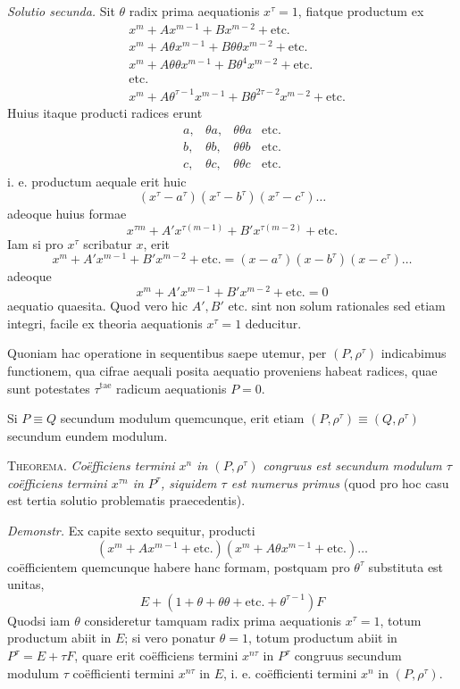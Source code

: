 \emph{Solutio secunda.} Sit $\theta$ radix prima aequationis $x^\tau=1$, fiatque productum ex
\[
\begin{aligned}
&x^m+Ax^{m-1}+Bx^{m-2}+\text{etc.}\\
&x^m+A\theta x^{m-1}+B\theta\theta x^{m-2}+\text{etc.}\\
&x^m+A\theta\theta x^{m-1}+B\theta^4x^{m-2}+\text{etc.}\\
&\text{etc.}\\
&x^m+A\theta^{\tau-1}x^{m-1}+B\theta^{2\tau-2}x^{m-2}+\text{etc.}
\end{aligned}
\]
Huius itaque producti radices erunt
\[
\begin{array}{llll}
a,&\theta a,&\theta\theta a&\text{etc.}\\
b,&\theta b,&\theta\theta b&\text{etc.}\\
c,&\theta c,&\theta\theta c&\text{etc.}
\end{array}
\]
i. e. productum aequale erit huic
\[
(x^\tau-a^\tau)(x^\tau-b^\tau)(x^\tau-c^\tau)\ldots
\]
adeoque huius formae
\[
x^{\tau m}+A'x^{\tau(m-1)}+B'x^{\tau(m-2)}+\text{etc.}
\]
Iam si pro $x^\tau$ scribatur $x$, erit
\[
x^m+A'x^{m-1}+B'x^{m-2}+\text{etc.}=(x-a^\tau)(x-b^\tau)(x-c^\tau)\ldots
\]
adeoque
\[
x^m+A'x^{m-1}+B'x^{m-2}+\text{etc.}=0
\]
aequatio quaesita. Quod vero hic $A',B'$ etc. sint non solum rationales sed etiam integri, facile ex theoria aequationis $x^\tau=1$ deducitur.

Quoniam hac operatione in sequentibus saepe utemur, per $(P,\rho^\tau)$ 
%
indicabimus functionem, qua cifrae aequali posita aequatio proveniens habeat radices, quae sunt potestates $\tau^{\mathrm{tae}}$ radicum aequationis $P=0$.

Si $P\equiv Q$ secundum modulum quemcunque, erit etiam $(P,\rho^\tau)\equiv(Q,\rho^\tau)$ secundum eundem modulum.

\textsc{Theorema.} \emph{Coëfficiens termini $x^n$ in $(P,\rho^\tau)$ congruus est secundum modulum $\tau$ coëfficiens termini $x^{\tau n}$ in $P^\tau$, siquidem $\tau$ est numerus primus} (quod pro hoc casu est tertia solutio problematis praecedentis).

\emph{Demonstr.} Ex capite sexto sequitur, producti
\[
(x^m+Ax^{m-1}+\text{etc.})(x^m+A\theta x^{m-1}+\text{etc.})\ldots
\]
coëfficientem quemcunque habere hanc formam, postquam pro $\theta^\tau$ substituta est unitas,
\[
E+(1+\theta+\theta\theta+\text{etc.}+\theta^{\tau-1})F
\]
Quodsi iam $\theta$ consideretur tamquam radix prima aequationis $x^\tau=1$, totum productum abiit in $E$; si vero ponatur $\theta=1$, totum productum abiit in $P^\tau=E+\tau F$, quare erit coëfficiens termini $x^{n\tau}$ in $P^\tau$ congruus secundum modulum $\tau$ coëfficienti termini $x^{n\tau}$ in $E$, i. e. coëfficienti termini $x^n$ in $(P,\rho^\tau)$.

